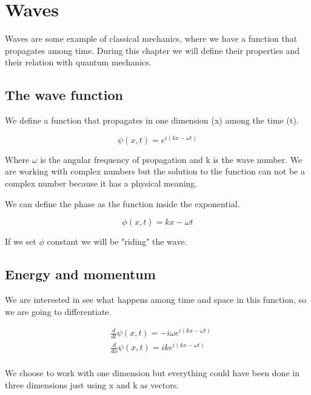 \setchapterpreamble[u]{\margintoc}
\chapter{Waves}

Waves are some example of classical mechanics, where we have a function that propagates among time. During this chapter we will define their properties and their relation with quantum mechanics.

\section{The wave function}

We define a function that propagates in one dimension (x) among the time (t).

\begin{equation}
\label{wave_function}
    \psi(x,t) = e^{i(kx-\omega t)}
\end{equation}

Where $\omega$ is the angular frequency of propagation and k is the wave number. We are working with complex numbers but the solution to the function can not be a complex number because it has a physical meaning.


We can define the phase as the function inside the exponential.

\begin{equation}
    \label{phase_def}
    \phi(x,t) = kx-\omega t
\end{equation}

If we set $\phi$ constant we will be "riding" the wave.

\section{Energy and momentum}

We are interested in see what happens among time and space in this function, so we are going to differentiate.

\begin{equation}
    \label{diff_wave}
    \begin{split}
        &\frac{d}{dt}\psi(x,t) = -i\omega e^{i(kx-\omega t)}\\
        &\frac{d}{dx}\psi(x,t) = ik e^{i(kx-\omega t)}\\
    \end{split}
\end{equation}

We choose to work with one dimension but everything could have been done in three dimensions just using x and k as vectors.

